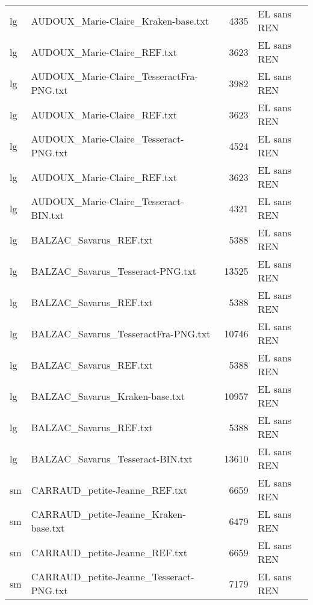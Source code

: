 \begin{tabular}{llrl}
    lg &                AUDOUX\_Marie-Claire\_Kraken-base.txt &                  4335 & EL sans REN \\
    lg &                        AUDOUX\_Marie-Claire\_REF.txt &                  3623 & EL sans REN \\
    lg &           AUDOUX\_Marie-Claire\_TesseractFra-PNG.txt &                  3982 & EL sans REN \\
    lg &                        AUDOUX\_Marie-Claire\_REF.txt &                  3623 & EL sans REN \\
    lg &              AUDOUX\_Marie-Claire\_Tesseract-PNG.txt &                  4524 & EL sans REN \\
    lg &                        AUDOUX\_Marie-Claire\_REF.txt &                  3623 & EL sans REN \\
    lg &              AUDOUX\_Marie-Claire\_Tesseract-BIN.txt &                  4321 & EL sans REN \\
    lg &                             BALZAC\_Savarus\_REF.txt &                  5388 & EL sans REN \\
    lg &                   BALZAC\_Savarus\_Tesseract-PNG.txt &                 13525 & EL sans REN \\
    lg &                             BALZAC\_Savarus\_REF.txt &                  5388 & EL sans REN \\
    lg &                BALZAC\_Savarus\_TesseractFra-PNG.txt &                 10746 & EL sans REN \\
    lg &                             BALZAC\_Savarus\_REF.txt &                  5388 & EL sans REN \\
    lg &                     BALZAC\_Savarus\_Kraken-base.txt &                 10957 & EL sans REN \\
    lg &                             BALZAC\_Savarus\_REF.txt &                  5388 & EL sans REN \\
    lg &                   BALZAC\_Savarus\_Tesseract-BIN.txt &                 13610 & EL sans REN \\
    sm &                      CARRAUD\_petite-Jeanne\_REF.txt &                  6659 & EL sans REN \\
    sm &              CARRAUD\_petite-Jeanne\_Kraken-base.txt &                  6479 & EL sans REN \\
    sm &                      CARRAUD\_petite-Jeanne\_REF.txt &                  6659 & EL sans REN \\
    sm &            CARRAUD\_petite-Jeanne\_Tesseract-PNG.txt &                  7179 & EL sans REN \\

\end{tabular}
